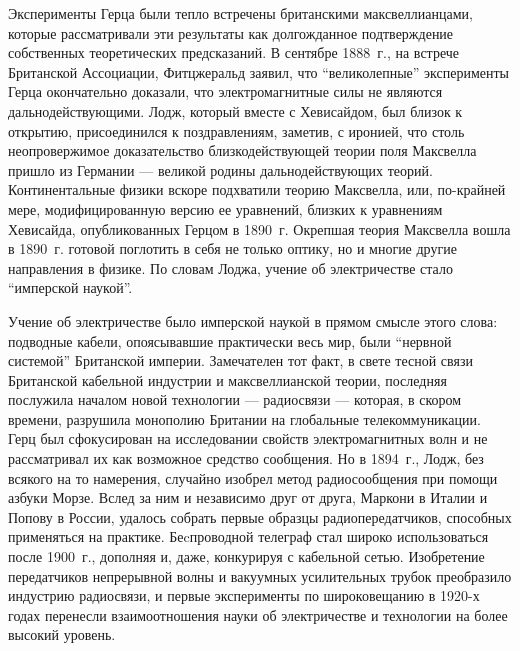 \documentclass[12pt, oneside, a4paper]{article}
\begin{document}
Эксперименты Герца были тепло встречены британскими максвеллианцами, которые рассматривали эти результаты как долгожданное подтверждение собственных теоретических предсказаний. В сентябре 1888~г., на встрече Британской Ассоциации, Фитцжеральд заявил, что ``великолепные'' эксперименты Герца окончательно доказали, что электромагнитные силы не являются дальнодействующими. Лодж, который вместе с Хевисайдом, был близок к открытию, присоединился к поздравлениям, заметив, с иронией, что столь неопровержимое доказательство близкодействующей теории поля Максвелла пришло из Германии --- великой родины дальнодействующих теорий. Континентальные физики вскоре подхватили теорию Максвелла, или, по-крайней мере, модифицированную версию ее уравнений, близких к уравнениям Хевисайда, опубликованных Герцом в 1890~г. Окрепшая теория Максвелла вошла в 1890~г. готовой поглотить в себя не только оптику, но и многие другие направления в физике. По словам Лоджа, учение об электричестве стало ``имперской наукой''.

Учение об электричестве было имперской наукой в прямом смысле этого слова: подводные кабели, опоясывавшие практически весь мир, были ``нервной системой'' Британской империи. Замечателен тот факт, в свете тесной связи Британской кабельной индустрии и максвеллианской теории, последняя послужила началом новой технологии --- радиосвязи --- которая, в скором времени, разрушила монополию Британии на глобальные телекоммуникации. Герц был сфокусирован на исследовании свойств электромагнитных волн и не рассматривал их как возможное средство сообщения.  Но в 1894~г., Лодж, без всякого на то намерения, случайно изобрел метод радиосообщения при помощи азбуки Морзе. Вслед за ним и независимо друг от друга, Маркони в Италии и Попову в России, удалось собрать первые образцы радиопередатчиков, способных применяться на практике. Беcпроводной телеграф стал широко использоваться после 1900~г., дополняя и, даже, конкурируя с кабельной сетью. Изобретение передатчиков непрерывной волны и вакуумных усилительных трубок преобразило индустрию радиосвязи, и первые эксперименты по широковещанию в 1920-х годах перенесли взаимоотношения науки об электричестве и технологии на более высокий уровень.
\end{document}
